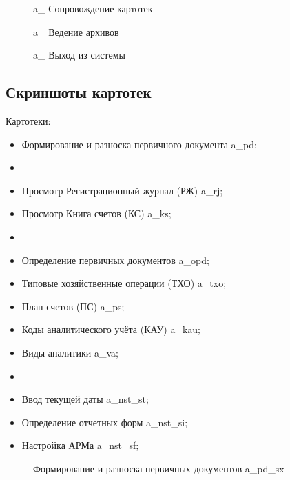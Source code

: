 \begin{figure}[!htb]
    \centering
    \caption{\gpiFIO\/a\_ Сопровождение картотек}
\end{figure}

\begin{figure}[!htb]
    \centering
    \caption{\gpiFIO\/a\_ Ведение архивов}
\end{figure}

\begin{figure}[!htb]
    \centering
    \caption{\gpiFIO\/a\_ Выход из системы}
\end{figure}

\newpage

\subsection{Скриншоты картотек}

Картотеки:

\begin{itemize}
\item Формирование и разноска первичного документа \gpiFIO\/a\_pd;
\item[] \hspace{0pt}
\item Просмотр Регистрационный журнал (РЖ) \gpiFIO\/a\_rj;
\item Просмотр Книга счетов (КС) \gpiFIO\/a\_ks;
\item[] \hspace{0pt}
\item Определение первичных документов \gpiFIO\/a\_opd;
\item Типовые хозяйственные операции (ТХО) \gpiFIO\/a\_txo;
\item План счетов (ПС) \gpiFIO\/a\_ps;
\item Коды аналитического учёта (КАУ) \gpiFIO\/a\_kau;
\item Виды аналитики \gpiFIO\/a\_va;
\item[] \hspace{0pt}
\item Ввод текущей даты \gpiFIO\/a\_nst\_st;
\item Определение отчетных форм \gpiFIO\/a\_nst\_si;
\item Настройка АРМа \gpiFIO\/a\_nst\_sf;
\end{itemize}

\begin{figure}[!htb]
    \centering
    \caption{Формирование и разноска первичных документов \gpiFIO\/a\_pd\_sx}
\end{figure}

